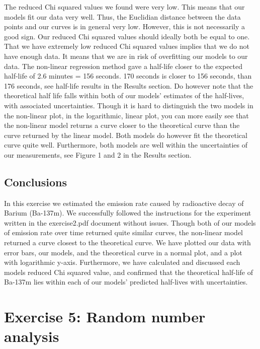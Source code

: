 \documentclass[letterpaper,12pt]{article}
\begin{document}
The reduced Chi squared values we found were very low. This means that our models 
fit our data very well. Thus, the Euclidian distance between the data points and 
our curves is in general very low. However, this is not necessarily a good sign. 
Our reduced Chi squared values should ideally both be equal to one. 
That we have extremely low reduced Chi squared values implies that we do not 
have enough data. It means that we are in risk of overfitting our models to our data.
The non-linear regression method gave a half-life closer to the expected 
half-life of 2.6 minutes = 156 seconds. 170 seconds is closer to 156 seconds, 
than 176 seconds, see half-life results in the Results section. Do however note 
that the theoretical half life falls within both of our models’ estimates of 
the half-lives, with associated uncertainties.
Though it is hard to distinguish the two models in the non-linear plot, in the 
logarithmic, linear plot, you can more easily see that the non-linear model 
returns a curve closer to the theoretical curve than the curve returned by the 
linear model. Both models do however fit the theoretical curve quite well. 
Furthermore, both models are well within the uncertainties of our measurements, 
see Figure 1 and 2 in the Results section.

\subsection{Conclusions}

In this exercise we estimated the emission rate caused by radioactive 
decay of Barium (Ba-137m). We successfully followed the instructions for 
the experiment written in the exercise2.pdf document without issues. 
Though both of our models of emission rate over time returned quite similar 
curves, the non-linear model returned a curve closest to the theoretical curve. 
We have plotted our data with error bars, our models, and the theoretical 
curve in a normal plot, and a plot with logarithmic y-axis. Furthermore, 
we have calculated and discussed each models reduced Chi squared value, 
and confirmed that the theoretical half-life of Ba-137m lies within each of 
our models’ predicted half-lives with uncertainties. 

\pagebreak

\section{Exercise 5:  Random number analysis}
\end{document}
